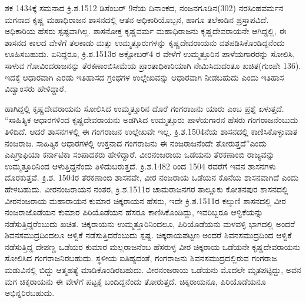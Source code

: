ಶಕ 1434ಕ್ಕೆ ಸಮನಾದ ಕ್ರಿ.ಶ.1512 ಡಿಸೆಂಬರ್​ 9ನೆಯ ದಿನಾಂಕದ, ನಂಜನಗೂಡಿನ(302) ನರಸಿಂಹವರ್ಮನ ಮಗನಾದ ಕೃಷ್ಣ ಮಹಾಧಿರಾಜನ ಶಾಸನದಲ್ಲಿ ಆತನ ಅಧಿಕಾರಿಯೊಬ್ಬನ, ಹಾಗೂ ತಲೆಕಾಡಿನ ಪ್ರಸ್ತಾಪವಿದೆ. ಅಧಿಕಾರಿಯ ಹೆಸರು ಸ್ಪಷ್ಟವಾಗಿಲ್ಲ. ಶಾಸನೋಕ್ತ ಕೃಷ್ಣವರ್ಮ ಮಹಾಧಿರಾಜನು ಕೃಷ್ಣದೇವರಾಯನೇ ಆಗಿದ್ದಲ್ಲಿ, ಈ ಶಾಸನದ ಕಾಲದ ವೇಳೆಗೆ ತಲಕಾಡು ಮತ್ತು ಉಮ್ಮತ್ತೂರುಗಳನ್ನು ಕೃಷ್ಣದೇವರಾಯನು ವಶಪಡಿಸಿಕೊಂಡಿದ್ದನೆಂದು ಊಹಿಸಬಹುದು. ಏನಿದ್ದರೂ, ಕ್ರಿ.ಶ.1513ರ ಅಕ್ಟೋಬರ್​4 ರ ವೇಳೆಗೆ ಉಮ್ಮತ್ತೂರಿನ ಪಾಳೆಯಗಾರರನ್ನು ಸೋಲಿಸಿ, ಸಾಳುವ ಗೋವಿಂದರಾಜನನ್ನು ತೆರಕಣಾಂಬಿಸೀಮೆಯ ಪ್ರಾಂತಾಧಿಕಾರಿಯಾಗಿ ನೇಮಿಸಿದುದಂತೂ ಖಚಿತ(ಗುಂಪೇ 136). ಇದಕ್ಕೆ ಆಧಾರವಾಗಿ ಎರಡು ಇತಿಹಾಸದ ಗ್ರಂಥಗಳ ಉಲ್ಲೇಖವನ್ನು ಆಧಾರವಾಗಿ ನೀಡಬಹುದು ಎಂದು ಇತಿಹಾಸ ವಿದ್ವಾಂಸರು ಹೇಳಿದ್ದಾರೆ.

ಹಾಗಿದ್ದಲ್ಲಿ ಕೃಷ್ಣದೇವರಾಯನು ಸೋಲಿಸಿದ ಉಮ್ಮತ್ತೂರಿನ ದೊರೆ ಗಂಗರಾಜನು ಯಾರು ಎಂಬ ಪ್ರಶ್ನೆ ಏಳುತ್ತದೆ. “ಸಾಹಿತ್ಯಿಕ ಆಧಾರಗಳಿಂದ ಕೃಷ್ಣದೇವರಾಯನು ಅಡಗಿಸಿದ ಉಮ್ಮತ್ತೂರು ಪಾಳೆಯಗಾರನ ಹೆಸರು ಗಂಗರಾಜನೆಂಬುದು ತಿಳಿದಿದೆ. ಆದರೆ ಶಾಸನಗಳಲ್ಲಿ ಈ ಗಂಗರಾಜನ ಉಲ್ಲೇಖವೇ ಇಲ್ಲ. ಕ್ರಿ.ಶ.1504ನೆಯ ಶಾಸನದಲ್ಲಿ ಕಾಣಿಸಿಕೊಳ್ಳುವಾತ ನಂಜರಾಜ. ಸಾಹಿತ್ಯಿಕ ಆಧಾರಗಳಲ್ಲಿ ಉಕ್ತನಾದ ಗಂಗರಾಜನು ಈ ನಂಜರಾಜನೆಂದೇ ತೋರುತ್ತದೆ”ಎಂದು ಎಪಿಗ್ರಾಫಿಯಾ ಕರ್ನಾಟಿಕಾ ಸಂಪಾದಕರು ಹೇಳಿದ್ದಾರೆ. ವೀರನಂಜರಾಯ ಒಡೆಯನು ತೆರಕಣಾಂಬಿ ರಾಜ್ಯವನ್ನು ಉಮ್ಮತ್ತೂರಿನಿಂದ ಆಳುತ್ತಿದ್ದನೆಂದು ತಿಳಿದುಬರುತ್ತದೆ. ಕ್ರಿ.ಶ.1482 ರಿಂದ 1504 ರವರೆಗೆ ಇವನ ಶಾಸನಗಳು ದೊರಕುತ್ತವೆ. ಕ್ರಿ.ಶ. 1504ರ ತೆರಕಣಾಂಬಿ ಶಾಸನವೇ, ವೀರ ನಂಜರಾಯ ಒಡೆಯನ ಕೊನೆಯ ಶಾಸನವಾಗಿದೆ ಎಂದು ಹೇಳಬಹುದು. ವೀರನಂಜರಾಯನ ನಂತರ, ಕ್ರಿ.ಶ.1511ರ ಚಾಮರಾಜನಗರ ತಾಲ್ಲೂಕು ಕೋತನಪುರ ಶಾಸನದಲ್ಲಿ ವೀರನಂಜರಾಯ ಮಹಾರಾಯನ ಕುಮಾರ ಚಿಕ್ಕರಾಯನ ಹೆಸರು, ಇದೇ ಕ್ರಿ.ಶ.1511ರ ಕಲ್ಕುಣಿ ಶಾಸನದಲ್ಲಿ ವೀರ ನಂಜರಾಜೊಡೆಯನ ಕುಮಾರ ಪಿರಿಯೊಡೆಯನ ಹೆಸರೂ ಕಾಣಿಸಿಕೊಂಡಿದ್ದು, ಇವರಿಬ್ಬರೂ ಆಳ್ವಿಕೆಯನ್ನು ನಡೆಸುತ್ತಿದ್ದರೆಂಬುದು ಖಚಿತ. ಚಿಕ್ಕರಾಯನು ಉಮ್ಮತ್ತೂರಿನಿಂದಲೂ, ಪಿರಿಯೊಡೆಯನು ಮಳವಳ್ಳಿ ಭಾಗದಲ್ಲಿ ಅಂದರೆ ಶಿವನಸಮುದ್ರದಿಂದಲೂ ಆಳ್ವಿಕೆ ನಡೆಸುತ್ತಿದರೆಂಬುದು ಸ್ಪಷ್ಟ. ಚಿಕ್ಕರಾಯಪಟ್ಟಣ ಅಂದರೆ ಶಿವನಸಮುದ್ರದಿಂದ ಆಳ್ವಿಕೆ ನಡೆಸುತ್ತಿದ್ದ ದೇಪಣ್ಣ ಒಡೆಯರ ಕುಮಾರ ಮಲ್ಲರಾಜನೆಂಬ ಹೆಸರುಳ್ಳ ವೀರ ಚಿಕ್ಕರಾಯ ಒಡೆಯನೇ ಕೃಷ್ಣದೇವರಾಯನು ಸೋಲಿಸಿದ ಗಂಗರಾಜನಿರಬಹುದು. ಸ್ಥಳೀಯ ಐತಿಹ್ಯದಂತೆ, ಗಂಗರಾಜನು ಶಿವನಸಮುದ್ರ\-ದಲ್ಲಿರುವ ಗಂಗರಾಜ ಮಡುವಿನಲ್ಲಿ ಬಿದ್ದು ಆತ್ಮಹತ್ಯೆ ಮಾಡಿಕೊಂಡಿರಬಹುದು. ವೀರನಂಜರಾಯ ಒಡೆಯನು ಮೊದಲೇ ಮೃತಪಟ್ಟಿದ್ದು, ಅವನ ಮಗ ಚಿಕ್ಕರಾಯನು ಈ ವೇಳೆಗೆ ಪಟ್ಟಕ್ಕೆ ಬಂದಿದ್ದನೆಂದು ತೋರುತ್ತದೆ. ಚಿಕ್ಕರಾಯನೂ, ಪಿರಿಯೊಡೆಯನೂ ಅಭಿನ್ನರಿರಬಹುದು.

